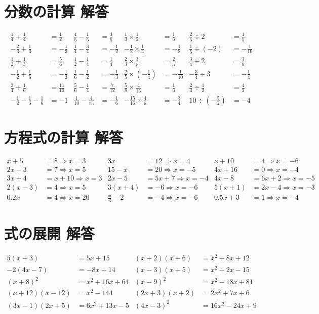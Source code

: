 \documentclass[paper=b4j,landscape,twocolumn,fleqn]{jlreq}
\begin{document}
\section{分数の計算 解答}
\begin{align*}
\frac{1}{4}+\frac{1}{4}&=\frac{1}{2} & \frac{4}{5}-\frac{1}{5}&=\frac{3}{5} & \frac{1}{3}\times\frac{1}{2}&=\frac{1}{6} & \frac{2}{5}\div2&=\frac{1}{5}\\
-\frac{2}{3}+\frac{1}{3}&=-\frac{1}{3} & \frac{1}{4}-\frac{3}{4}&=-\frac{1}{2} & -\frac{1}{2}\times\frac{1}{4}&=-\frac{1}{8} & \frac{1}{5}\div(-2)&=-\frac{1}{10}\\
\frac{1}{2}+\frac{1}{3}&=\frac{5}{6} & \frac{1}{2}-\frac{1}{4}&=\frac{1}{4} & \frac{2}{3}\times\frac{3}{5}&=\frac{2}{5} & \frac{3}{4}\div2&=\frac{3}{8}\\
-\frac{1}{2}+\frac{1}{6}&=-\frac{1}{3} & \frac{1}{6}-\frac{1}{2}&=-\frac{1}{3} & \frac{2}{5}\times\left(-\frac{1}{4}\right)&=-\frac{1}{10} & -\frac{3}{4}\div3&=-\frac{1}{4}\\
\frac{3}{4}+\frac{1}{6}&=\frac{11}{12} & \frac{5}{6}-\frac{1}{4}&=\frac{7}{12} & \frac{5}{8}\times\frac{4}{15}&=\frac{1}{6} & \frac{2}{3}\div\frac{1}{2}&=\frac{4}{3}\\
-\frac{1}{2}-\frac{1}{3}-\frac{1}{6}&=-1 & \frac{1}{10}-\frac{4}{15}&=-\frac{1}{6} & -\frac{15}{16}\times\frac{4}{5}&=-\frac{3}{4} & 10\div\left(-\frac{5}{2}\right)&=-4
\end{align*}

\newpage
\section{方程式の計算 解答}
\begin{align*}
x+5&=8\Rightarrow x=3 & 3x&=12\Rightarrow x=4 & x+10&=4\Rightarrow x=-6\\
2x-3&=7\Rightarrow x=5 & 15-x&=20\Rightarrow x=-5 & 4x+16&=0\Rightarrow x=-4\\
3x+4&=x+10\Rightarrow x=3 & 2x-5&=5x+7\Rightarrow x=-4 & 4x-8&=6x+2\Rightarrow x=-5\\
2(x-3)&=4\Rightarrow x=5 & 3(x+4)&=-6\Rightarrow x=-6 & 5(x+1)&=2x-4\Rightarrow x=-3\\
0.2x&=4\Rightarrow x=20 & \frac{x}{3}-2&=-4\Rightarrow x=-6 & 0.5x+3&=1\Rightarrow x=-4
\end{align*}

\section{式の展開 解答}
\begin{align*}
5(x+3)&=5x+15 & (x+2)(x+6)&=x^2+8x+12\\
-2(4x-7)&=-8x+14 & (x-3)(x+5)&=x^2+2x-15\\
(x+8)^2&=x^2+16x+64 & (x-9)^2&=x^2-18x+81\\
(x+12)(x-12)&=x^2-144 & (2x+3)(x+2)&=2x^2+7x+6\\
(3x-1)(2x+5)&=6x^2+13x-5 & (4x-3)^2&=16x^2-24x+9
\end{align*}
\end{document}
